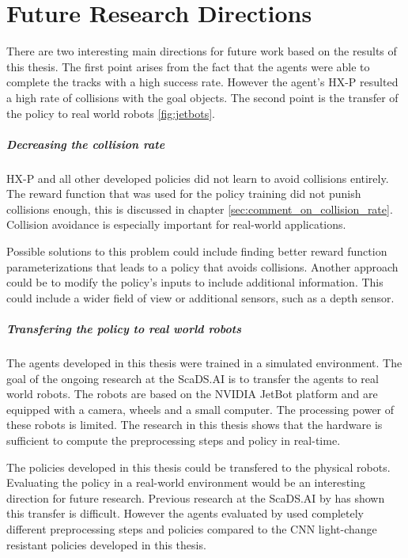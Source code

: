 \chapter{Future Research Directions}
\label{cha:futur_research_directions}

There are two interesting main directions for future work based on the results of this thesis. The first point arises from the fact that the agents were able to complete the tracks with a high success rate. However the agent's \ac{HX-P} resulted a high rate of collisions with the goal objects. The second point is the transfer of the policy to real world robots \ref{fig:jetbots}.


\paragraph{Decreasing the collision rate}

\acs{HX-P} and all other developed policies did not learn to avoid collisions entirely. The reward function that was used for the policy training did not punish collisions enough, this is discussed in chapter \ref{sec:comment_on_collision_rate}. Collision avoidance is especially important for real-world applications.

Possible solutions to this problem could include finding better reward function parameterizations that leads to a policy that avoids collisions. Another approach could be to modify the policy's inputs to include additional information. This could include a wider field of view or additional sensors, such as a depth sensor.

\paragraph{Transfering the policy to real world robots}

The agents developed in this thesis were trained in a simulated environment. The goal of the ongoing research at the ScaDS.AI is to transfer the agents to real world robots. The robots are based on the NVIDIA JetBot platform and are equipped with a camera, wheels and a small computer. The processing power of these robots is limited. The research in this thesis shows that the hardware is sufficient to compute the preprocessing steps and policy in real-time.

The policies developed in this thesis could be transfered to the physical robots. Evaluating the policy in a real-world environment would be an interesting direction for future research. Previous research at the ScaDS.AI by \textcite{merlin_flach} has shown this transfer is difficult. However the agents evaluated by \textcite{merlin_flach} used completely different preprocessing steps and policies compared to the \ac{CNN} light-change resistant policies developed in this thesis. 



